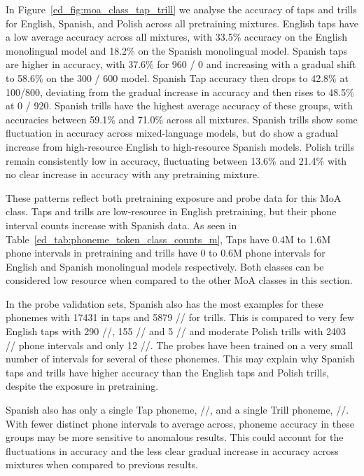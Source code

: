 In Figure~\ref{ed_fig:moa_class_tap_trill} we analyse the accuracy of taps and trills for English, Spanish, and Polish across all pretraining mixtures. English taps have a low average accuracy across all mixtures, with 33.5\% accuracy on the English monolingual model and 18.2\% on the Spanish monolingual model. Spanish taps are higher in accuracy, with 37.6\% for 960 / 0 and increasing with a gradual shift to 58.6\% on the 300 / 600 model. Spanish Tap accuracy then drops to 42.8\% at 100/800, deviating from the gradual increase in accuracy and then rises to 48.5\% at 0 / 920. Spanish trills have the highest average accuracy of these groups, with accuracies between 59.1\% and 71.0\% across all mixtures. Spanish trills show some fluctuation in accuracy across mixed-language models, but do show a gradual increase from high-resource English to high-resource Spanish models. Polish trills remain consistently low in accuracy, fluctuating between 13.6\% and 21.4\% with no clear increase in accuracy with any pretraining mixture.%


These patterns reflect both pretraining exposure and probe data for this MoA class. Taps and trills are low‑resource in English pretraining, but their phone interval counts increase with Spanish data. As seen in Table~\ref{ed_tab:phoneme_token_class_counts_m}, Taps have 0.4M to 1.6M phone intervals in pretraining and trills have 0 to 0.6M phone intervals for English and Spanish monolingual models respectively. Both classes can be considered low resource when compared to the other MoA classes in this section. 

In the probe validation sets, Spanish also has the most examples for these phonemes with 17431  in taps and 5879 // for trills. This is compared to very few English taps with 290 //, 155 // and 5 // and moderate Polish trills with 2403 // phone intervals and only 12 //. The probes have been trained on a very small number of intervals for several of these phonemes. This may explain why Spanish taps and trills have higher accuracy than the English taps and Polish trills, despite the exposure in pretraining. 

Spanish also has only a single Tap phoneme, //, and a single Trill phoneme, //. With fewer distinct phone intervals to average across, phoneme accuracy in these groups may be more sensitive to anomalous results. This could account for the fluctuations in accuracy and the less clear gradual increase in accuracy across mixtures when compared to previous results.%

